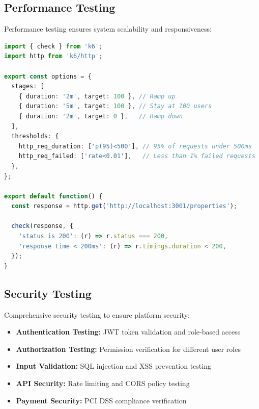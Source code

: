 \documentclass[conference]{IEEEtran}
\begin{document}
\subsection{Performance Testing}
Performance testing ensures system scalability and responsiveness:

\begin{lstlisting}[language=TypeScript, caption=Performance Test Example]
import { check } from 'k6';
import http from 'k6/http';

export const options = {
  stages: [
    { duration: '2m', target: 100 }, // Ramp up
    { duration: '5m', target: 100 }, // Stay at 100 users
    { duration: '2m', target: 0 },   // Ramp down
  ],
  thresholds: {
    http_req_duration: ['p(95)<500'], // 95% of requests under 500ms
    http_req_failed: ['rate<0.01'],   // Less than 1% failed requests
  },
};

export default function() {
  const response = http.get('http://localhost:3001/properties');
  
  check(response, {
    'status is 200': (r) => r.status === 200,
    'response time < 200ms': (r) => r.timings.duration < 200,
  });
}
\end{lstlisting}

\subsection{Security Testing}
Comprehensive security testing to ensure platform security:

\begin{itemize}
    \item \textbf{Authentication Testing:} JWT token validation and role-based access
    \item \textbf{Authorization Testing:} Permission verification for different user roles
    \item \textbf{Input Validation:} SQL injection and XSS prevention testing
    \item \textbf{API Security:} Rate limiting and CORS policy testing
    \item \textbf{Payment Security:} PCI DSS compliance verification
\end{itemize}
\end{document}
